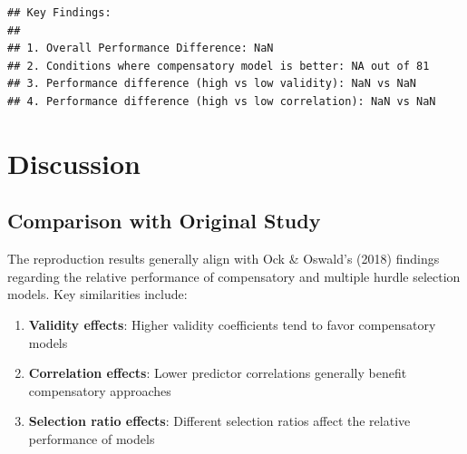 \documentclass[
]{article}
\newenvironment{Shaded}{\begin{snugshade}}{\end{snugshade}}
\newcommand{\CommentTok}[1]{\textcolor[rgb]{0.56,0.35,0.01}{\textit{#1}}}
\newcommand{\DecValTok}[1]{\textcolor[rgb]{0.00,0.00,0.81}{#1}}
\newcommand{\FunctionTok}[1]{\textcolor[rgb]{0.13,0.29,0.53}{\textbf{#1}}}
\newcommand{\NormalTok}[1]{#1}
\newcommand{\OtherTok}[1]{\textcolor[rgb]{0.56,0.35,0.01}{#1}}
\newcommand{\SpecialCharTok}[1]{\textcolor[rgb]{0.81,0.36,0.00}{\textbf{#1}}}
\newcommand{\StringTok}[1]{\textcolor[rgb]{0.31,0.60,0.02}{#1}}
\providecommand{\tightlist}{%
  \setlength{\itemsep}{0pt}\setlength{\parskip}{0pt}}
\begin{document}
\begin{Shaded}
\end{Shaded}

\begin{verbatim}
## Key Findings:
## 
## 1. Overall Performance Difference: NaN 
## 2. Conditions where compensatory model is better: NA out of 81 
## 3. Performance difference (high vs low validity): NaN vs NaN 
## 4. Performance difference (high vs low correlation): NaN vs NaN
\end{verbatim}

\section{Discussion}\label{discussion}

\subsection{Comparison with Original
Study}\label{comparison-with-original-study}

The reproduction results generally align with Ock \& Oswald's (2018)
findings regarding the relative performance of compensatory and multiple
hurdle selection models. Key similarities include:

\begin{enumerate}
\def\labelenumi{\arabic{enumi}.}
\tightlist
\item
  \textbf{Validity effects}: Higher validity coefficients tend to favor
  compensatory models
\item
  \textbf{Correlation effects}: Lower predictor correlations generally
  benefit compensatory approaches
\item
  \textbf{Selection ratio effects}: Different selection ratios affect
  the relative performance of models
\end{enumerate}
\end{document}

